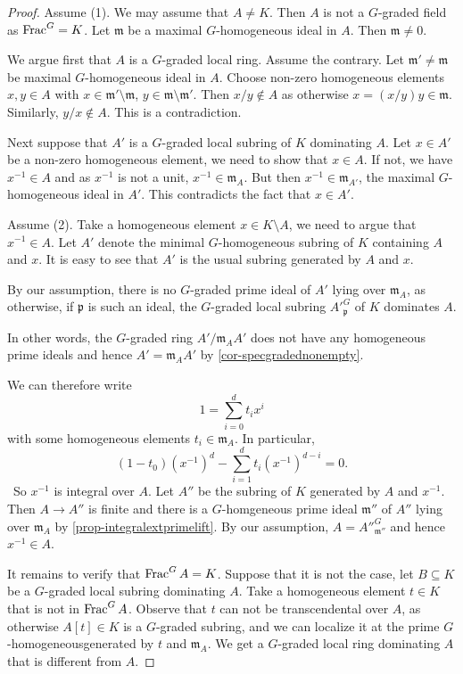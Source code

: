 \begin{proof}
    Assume (1). We may assume that $A\neq K$. Then $A$ is not a $G$-graded field as $\operatorname{Frac}^G=K$. Let $\mathfrak{m}$ be a maximal $G$-homogeneous ideal in $A$. Then $\mathfrak{m}\neq 0$. 
    
    We argue first that $A$ is a $G$-graded local ring. Assume the contrary.
    Let $\mathfrak{m}'\neq \mathfrak{m}$ be maximal $G$-homogeneous ideal in $A$. Choose non-zero homogeneous elements $x,y\in A$ with $x\in \mathfrak{m}'\setminus \mathfrak{m}$, $y\in \mathfrak{m}\setminus \mathfrak{m}'$. Then $x/y\not\in A$ as otherwise $x=(x/y)y\in \mathfrak{m}$. Similarly, $y/x\not\in A$. This is a contradiction.

    Next suppose that $A'$ is a $G$-graded local subring of $K$ dominating $A$. Let $x\in A'$ be a non-zero homogeneous element, we need to show that $x\in A$. If not, we have $x^{-1}\in A$ and as $x^{-1}$ is not a unit, $x^{-1}\in \mathfrak{m}_A$. But then $x^{-1}\in \mathfrak{m}_{A'}$, the maximal $G$-homogeneous ideal in $A'$. This contradicts the fact that $x\in A'$.

    Assume (2).  Take a homogeneous element $x\in K\setminus A$, we need to argue that $x^{-1}\in A$. Let $A'$ denote the minimal $G$-homogeneous subring of $K$ containing $A$ and $x$. It is easy to see that $A'$ is the usual subring generated by $A$ and $x$.
    
    By our assumption, there is no $G$-graded prime ideal of $A'$ lying over $\mathfrak{m}_A$, as otherwise, if $\mathfrak{p}$ is such an ideal, the $G$-graded local subring $A'^G_{\mathfrak{p}}$ of $K$ dominates $A$.

    In other words, the $G$-graded ring $A'/\mathfrak{m}_AA'$ does not  have any homogeneous prime ideals and hence $A'=\mathfrak{m}_AA'$ by \cref{cor-specgradednonempty}.

    We can therefore write
    \[
      1=\sum_{i=0}^d t_ix^i  
    \]
    with some homogeneous elements $t_i\in \mathfrak{m}_A$. In particular,
    \[
        (1-t_0)(x^{-1})^d-\sum_{i=1}^d t_i (x^{-1})^{d-i}=0.  
    \]\
    So $x^{-1}$ is integral over $A$. Let $A''$ be the subring of $K$ generated by $A$ and $x^{-1}$. Then $A\rightarrow A''$ is finite and there is a $G$-homgeneous prime ideal $\mathfrak{m}''$ of $A''$ lying over $\mathfrak{m}_A$ by \cref{prop-integralextprimelift}. By our assumption, $A=A''^G_{\mathfrak{m}''}$ and hence $x^{-1}\in A$.

    It remains to verify that $\operatorname{Frac}^G A=K$. Suppose that it is not the case, let $B\subseteq K$ be a $G$-graded local subring dominating $A$. Take a homogeneous element $t\in K$ that is not in $\operatorname{Frac}^G A$. Observe that $t$ can not be transcendental over $A$, as otherwise $A[t]\in K$ is a $G$-graded subring, and we can localize it at the prime $G$-homogeneousgenerated by $t$ and $\mathfrak{m}_A$. We get a $G$-graded local ring dominating $A$ that is different from $A$.


\end{proof}
